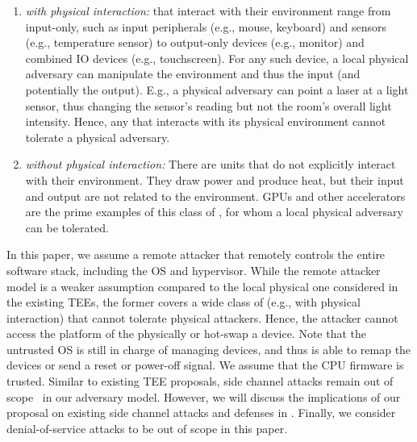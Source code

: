 \begin{enumerate}
\item \emph{\Sphw with physical interaction:}
\Sphw that interact with their environment range from input-only, such as input peripherals (e.g., mouse, keyboard) and sensors (e.g., temperature sensor) to output-only devices (e.g., monitor) and combined IO devices (e.g., touchscreen). For any such device, a local physical adversary can manipulate the environment and thus the input (and potentially the output). E.g., a physical adversary can point a laser at a light sensor, thus changing the sensor's reading but not the room's overall light intensity. Hence, any \sphw that interacts with its physical environment cannot tolerate a physical adversary.

\item \emph{\Sphw without physical interaction:}
There are \sphw units that do not explicitly interact with their environment. They draw power and produce heat, but their input and output are not related to the environment. GPUs and other accelerators are the prime examples of this class of \sphw, for whom a local physical adversary can be tolerated. 
\end{enumerate}

In this paper, we assume a remote attacker that remotely controls the entire software stack, including the OS and hypervisor. While the remote attacker model is a weaker assumption compared to the local physical one considered in the existing TEEs, the former covers a wide class of \sphw (e.g., \sphw with physical interaction) that cannot tolerate physical attackers. Hence, the attacker cannot access the platform of the \sphw physically or hot-swap a device. Note that the untrusted OS is still in charge of managing \sphw devices, and thus is able to remap the devices or send a reset or power-off signal.
We assume that the CPU firmware is trusted. Similar to existing TEE proposals, side channel attacks remain out of scope~\cite{costan2016intel} in our adversary model. However, we will discuss the implications of our proposal on existing side channel attacks and defenses in . Finally, we consider denial-of-service attacks to be out of scope in this paper. 


